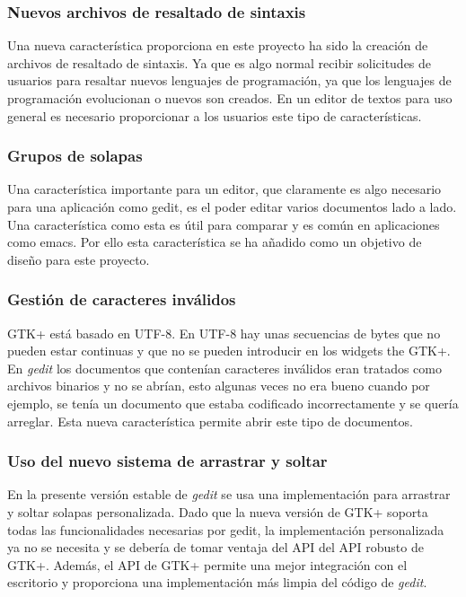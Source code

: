 \subsubsection{Nuevos archivos de resaltado de sintaxis}

Una nueva característica proporciona en este proyecto ha sido la creación de
archivos de resaltado de sintaxis. Ya que es algo normal recibir solicitudes
de usuarios para resaltar nuevos lenguajes de programación, ya que los lenguajes
de programación evolucionan o nuevos son creados. En un editor de textos para
uso general es necesario proporcionar a los usuarios este tipo de características.

\subsubsection{Grupos de solapas}

Una característica importante para un editor, que claramente es algo necesario
para una aplicación como gedit, es el poder editar varios documentos lado a lado.
Una característica como esta es útil para comparar y es común en aplicaciones
como emacs. Por ello esta característica se ha añadido como un objetivo de diseño
para este proyecto.

\subsubsection{Gestión de caracteres inválidos}

GTK+ está basado en UTF-8. En UTF-8 hay unas secuencias de bytes que no pueden
estar continuas y que no se pueden introducir en los widgets the GTK+. En \emph{gedit}
los documentos que contenían caracteres inválidos eran tratados como archivos
binarios y no se abrían, esto algunas veces no era bueno cuando por ejemplo, se
tenía un documento que estaba codificado incorrectamente y se quería arreglar.
Esta nueva característica permite abrir este tipo de documentos.

\subsubsection{Uso del nuevo sistema de arrastrar y soltar}

En la presente versión estable de \emph{gedit} se usa una implementación para
arrastrar y soltar solapas personalizada. Dado que la nueva versión de GTK+
soporta todas las funcionalidades necesarias por gedit, la implementación
personalizada ya no se necesita y se debería de tomar ventaja del API del API
robusto de GTK+. Además, el API de GTK+ permite una mejor integración con
el escritorio y proporciona una implementación más limpia del código de \emph{gedit}.

